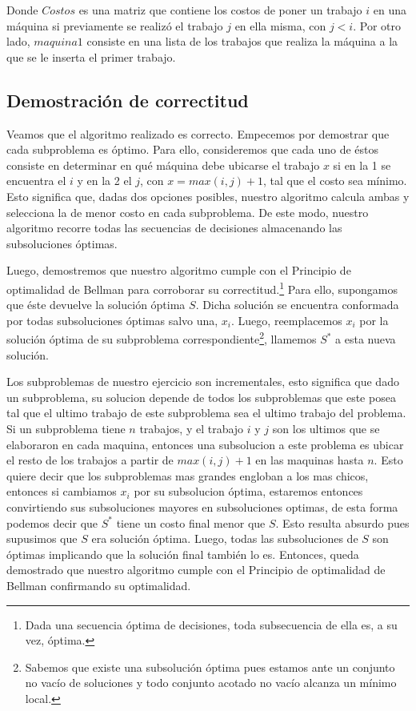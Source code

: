 Donde $Costos$ es una matriz que contiene los costos de poner un trabajo $i$ en una máquina si previamente se realizó el trabajo $j$ en ella misma, con $j<i$. Por otro lado, $maquina1$ consiste en una lista de los trabajos que realiza la máquina a la que se le inserta el primer trabajo.

\newpage
\subsection{Demostración de correctitud}

Veamos que el algoritmo realizado es correcto. Empecemos por demostrar que cada subproblema es óptimo. Para ello, consideremos que cada uno de éstos consiste en determinar en qué máquina debe ubicarse el trabajo $x$ si en la 1 se encuentra el $i$ y en la 2 el $j$, con $x=max(i,j)+1$, tal que el costo sea mínimo. Esto significa que, dadas dos opciones posibles, nuestro algoritmo calcula ambas y selecciona la de menor costo en cada subproblema. De este modo, nuestro algoritmo recorre todas las secuencias de decisiones almacenando las subsoluciones óptimas.

Luego, demostremos que nuestro algoritmo cumple con el Principio de optimalidad de Bellman para corroborar su correctitud.\footnote{Dada una secuencia óptima de decisiones, toda subsecuencia de ella es, a su vez, óptima.} Para ello, supongamos que éste devuelve la solución óptima $S$. Dicha solución se encuentra conformada por todas subsoluciones óptimas salvo una, $x_{i}$. Luego, reemplacemos $x_{i}$ por la solución óptima de su subproblema correspondiente\footnote{Sabemos que existe una subsolución óptima pues estamos ante un conjunto no vacío de soluciones y todo conjunto acotado no vacío alcanza un mínimo local.}, llamemos $S^*$ a esta nueva solución. 

Los subproblemas de nuestro ejercicio son incrementales, esto significa que dado un subproblema, su solucion depende de todos los subproblemas que este posea tal que el ultimo trabajo de este subproblema sea el ultimo trabajo del problema. Si un subproblema tiene $n$ trabajos, y el trabajo $i$ y $j$ son los ultimos que se elaboraron en cada maquina, entonces una subsolucion a este problema es ubicar el resto de los trabajos a partir de $max(i,j)+1$ en las maquinas hasta $n$. Esto quiere decir que los subproblemas mas grandes engloban a los mas chicos, entonces si cambiamos $x_{i}$ por su subsolucion óptima, estaremos entonces convirtiendo sus subsoluciones mayores en subsoluciones optimas, de esta forma podemos decir que $S^*$ tiene un costo final menor que $S$. Esto resulta absurdo pues supusimos que $S$ era solución óptima. Luego, todas las subsoluciones de $S$ son óptimas implicando que la solución final también lo es. Entonces, queda demostrado que nuestro algoritmo cumple con el Principio de optimalidad de Bellman confirmando su optimalidad.

